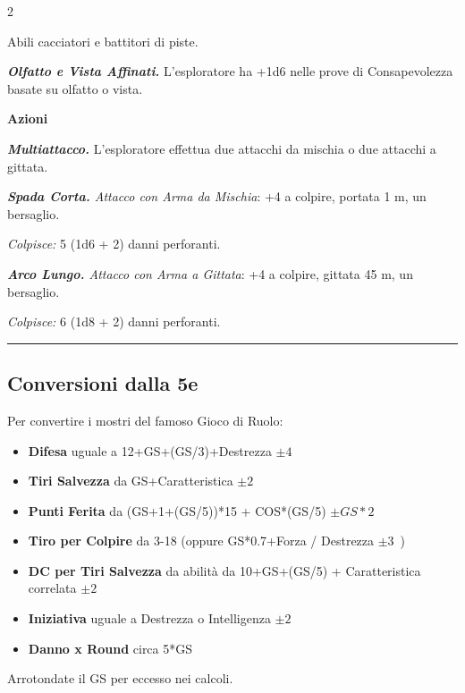 \begin{multicols}{2}
{Abili cacciatori e battitori di piste.

\emph{\textbf{Olfatto e Vista Affinati.}} L'esploratore ha +1d6 nelle prove di Consapevolezza basate su olfatto o vista.

\textbf{Azioni}

\emph{\textbf{Multiattacco.}} L'esploratore effettua due attacchi da mischia o due attacchi a gittata.

\emph{\textbf{Spada Corta.} Attacco con Arma da Mischia}: +4 a colpire, portata 1 m, un bersaglio.

\emph{Colpisce:} 5 (1d6 + 2) danni perforanti.

\emph{\textbf{Arco Lungo.} Attacco con Arma a Gittata}: +4 a colpire, gittata 45 m, un bersaglio.

\emph{Colpisce:} 6 (1d8 + 2) danni perforanti.

}  %




\rule{\linewidth}{2pt}

\subsection{Conversioni dalla 5e}

Per convertire i mostri del famoso Gioco di Ruolo:

\begin{itemize}[leftmargin=*] \setlength{\itemsep}{0pt}
\item \textbf{Difesa} uguale a 12+GS+(GS/3)+Destrezza $\pm4$\
\item \textbf{Tiri Salvezza} da GS+Caratteristica $\pm2$\
\item \textbf{Punti Ferita} da (GS+1+(GS/5))*15 + COS*(GS/5) $\pm GS*2$\
\item \textbf{Tiro per Colpire} da 3-18 (oppure GS*0.7+Forza / Destrezza $\pm3$\ )
\item \textbf{DC per Tiri Salvezza} da abilità da 10+GS+(GS/5) + Caratteristica correlata  $\pm2$\
\item \textbf{Iniziativa} uguale a Destrezza o Intelligenza  $\pm2$\
\item \textbf{Danno x Round} circa 5*GS
\end{itemize}

Arrotondate il GS per eccesso nei calcoli.

\end{multicols}

